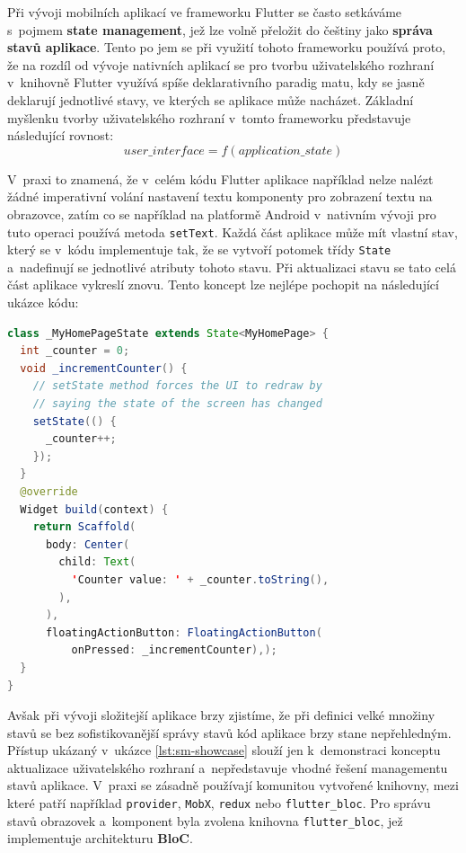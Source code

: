 \documentclass[12pt, a4paper]{article}
\begin{document}
Při vývoji mobilních aplikací ve frameworku Flutter se často setkáváme s~pojmem \textbf{state management}, jež lze volně přeložit do češtiny jako \textbf{správa stavů aplikace}. Tento po
jem se při využití tohoto frameworku používá proto, že na rozdíl od vývoje nativních aplikací se pro tvorbu uživatelského rozhraní v~knihovně Flutter využívá spíše deklarativního paradig
matu, kdy se jasně deklarují jednotlivé stavy, ve kterých se aplikace může nacházet. Základní myšlenku tvorby uživatelského rozhraní v~tomto frameworku představuje následující rovnost:
$$
user\_interface = f(application\_state)
$$

V~praxi to znamená, že v~celém kódu Flutter aplikace například nelze nalézt žádné imperativní volání nastavení textu komponenty pro zobrazení textu na obrazovce, zatím co se například na
 platformě Android v~nativním vývoji pro tuto operaci používá metoda \texttt{setText}. Každá část aplikace může mít vlastní stav, který se v~kódu implementuje tak, že se vytvoří potomek 
třídy \texttt{State} a~nadefinují se jednotlivé atributy tohoto stavu. Při aktualizaci stavu se tato celá část aplikace vykreslí znovu. Tento koncept lze nejlépe pochopit na následující 
ukázce kódu:

\begin{lstlisting}[language=Java,caption={Jednoduchá demonstrace aktualizace uživatelského rozhraní ve frameworku Flutter.},captionpos=b, label={lst:sm-showcase}]
class _MyHomePageState extends State<MyHomePage> {
  int _counter = 0;
  void _incrementCounter() {
    // setState method forces the UI to redraw by
    // saying the state of the screen has changed
    setState(() {
      _counter++;
    });
  }
  @override
  Widget build(context) {
    return Scaffold(
      body: Center(
        child: Text(
          'Counter value: ' + _counter.toString(),
        ),
      ),
      floatingActionButton: FloatingActionButton(
          onPressed: _incrementCounter),);
  }
}
\end{lstlisting}

Avšak při vývoji složitejší aplikace brzy zjistíme, že při definici velké množiny stavů se bez sofistikovanější správy stavů kód aplikace brzy stane nepřehledným. Přístup ukázaný v~ukázce \ref{lst:sm-showcase} slouží jen k~demonstraci konceptu aktualizace uživatelského rozhraní a~nepředstavuje vhodné řešení managementu stavů aplikace. V~praxi se zásadně používají komunitou vytvořené knihovny, mezi které patří například \texttt{provider}, \texttt{MobX}, \texttt{redux} nebo \texttt{flutter\_bloc}. Pro správu stavů obrazovek a~komponent byla zvolena knihovna \texttt{flutter\_bloc}, jež implementuje architekturu \textbf{BloC}.
\end{document}
